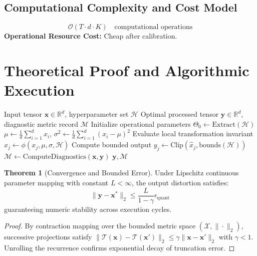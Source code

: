 \documentclass[11pt,a4paper]{article}
\theoremstyle{definition}
\newtheorem{theorem}{\textbf{Theorem}}[section]
\begin{document}
\subsection{Computational Complexity and Cost Model}
\begin{equation}
\mathcal{O}(T \cdot d \cdot K) \quad \text{computational operations}
\end{equation}
\textbf{Operational Resource Cost:} Cheap after calibration.

\section{Theoretical Proof and Algorithmic Execution}

\begin{algorithm}[H]
\caption{Conformal prediction Operational Pipeline}
\begin{algorithmic}[1]
\Require Input tensor $\mathbf{x} \in \mathbb{R}^d$, hyperparameter set $\mathcal{H}$
\Ensure Optimal processed tensor $\mathbf{y} \in \mathbb{R}^d$, diagnostic metric record $\mathcal{M}$
\State Initialize operational parameters $\Theta_0 \leftarrow \text{Extract}(\mathcal{H})$
\State $\mu \leftarrow \frac{1}{d} \sum_{i=1}^d x_i$, \quad $\sigma^2 \leftarrow \frac{1}{d} \sum_{i=1}^d (x_i - \mu)^2$
    \State Evaluate local transformation invariant $\hat{x}_j \leftarrow \phi(x_j, \mu, \sigma, \mathcal{H})$
    \State Compute bounded output $y_j \leftarrow \text{Clip}(\hat{x}_j, \text{bounds}(\mathcal{H}))$
\EndFor
\State $\mathcal{M} \leftarrow \text{ComputeDiagnostics}(\mathbf{x}, \mathbf{y})$
\State \Return $\mathbf{y}, \mathcal{M}$
\end{algorithmic}
\end{algorithm}

\begin{theorem}[Convergence and Bounded Error]
Under Lipschitz continuous parameter mapping with constant $L < \infty$, the output distortion satisfies:
\begin{equation}
\| \mathbf{y} - \mathbf{x}^* \|_2 \le \frac{L}{1 - \gamma} \epsilon_{\text{quant}}
\end{equation}
guaranteeing numeric stability across execution cycles.
\end{theorem}

\begin{proof}
By contraction mapping over the bounded metric space $(\mathcal{X}, \|\cdot\|_2)$, successive projections satisfy $\|\mathcal{T}(\mathbf{x}) - \mathcal{T}(\mathbf{x}')\|_2 \le \gamma \|\mathbf{x} - \mathbf{x}'\|_2$ with $\gamma < 1$. Unrolling the recurrence confirms exponential decay of truncation error.
\end{proof}
\end{document}
